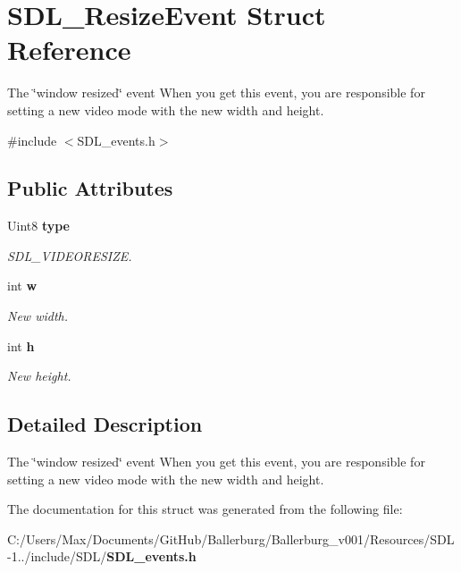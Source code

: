 \section{S\+D\+L\+\_\+\+Resize\+Event Struct Reference}
\label{struct_s_d_l___resize_event}


The \char`\"{}window resized\char`\"{} event When you get this event, you are responsible for setting a new video mode with the new width and height.  




{\ttfamily \#include $<$S\+D\+L\+\_\+events.\+h$>$}

\subsection*{Public Attributes}
\begin{DoxyCompactItemize}
\item 
Uint8 {\bf type}\label{struct_s_d_l___resize_event_a0f35cba640e999f4dd77e4267b812525}

\begin{DoxyCompactList}\small\item\em S\+D\+L\+\_\+\+V\+I\+D\+E\+O\+R\+E\+S\+I\+Z\+E. \end{DoxyCompactList}\item 
int {\bf w}\label{struct_s_d_l___resize_event_acd9eca9322c2d247bb0329e2ea97fc0f}

\begin{DoxyCompactList}\small\item\em New width. \end{DoxyCompactList}\item 
int {\bf h}\label{struct_s_d_l___resize_event_a323addc213067775cccb1c1032aebf8b}

\begin{DoxyCompactList}\small\item\em New height. \end{DoxyCompactList}\end{DoxyCompactItemize}


\subsection{Detailed Description}
The \char`\"{}window resized\char`\"{} event When you get this event, you are responsible for setting a new video mode with the new width and height. 

The documentation for this struct was generated from the following file\+:\begin{DoxyCompactItemize}
\item 
C\+:/\+Users/\+Max/\+Documents/\+Git\+Hub/\+Ballerburg/\+Ballerburg\+\_\+v001/\+Resources/\+S\+D\+L-\/1../include/\+S\+D\+L/{\bf S\+D\+L\+\_\+events.\+h}\end{DoxyCompactItemize}
